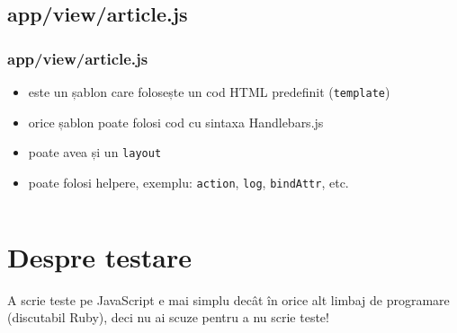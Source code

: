 \documentclass[compress]{beamer}
\begin{document}
\subsection{app/view/article.js}

\begin{frame}

\frametitle{app/view/article.js}

\begin{itemize}[<+->]
  \item este un șablon care folosește un cod HTML predefinit (\texttt{template})
  \item orice șablon poate folosi cod cu sintaxa Handlebars.js
  \item poate avea și un \texttt{layout}
  \item poate folosi helpere, exemplu: \texttt{action}, \texttt{log}, \texttt{bindAttr}, etc.
\end{itemize}

\inputminted[fontsize=\tiny,gobble=2,linenos=true,firstline=6,lastline=10]{javascript}{code/js/app/view/article.js}

\end{frame}

\section{Despre testare}

\begin{frame}
  \begin{center}
  \huge A scrie teste pe JavaScript e mai simplu decât în orice alt limbaj de programare (discutabil Ruby), deci nu ai scuze pentru a nu scrie teste!
  \end{center}
\end{frame}
\end{document}
